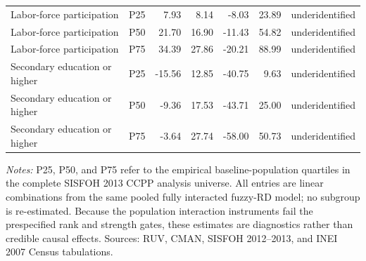 \begin{table}[!htbp]
{\begin{tabular}{llrrrrl}
Labor-force participation & P25 & 7.93 & 8.14 & -8.03 & 23.89 & underidentified \\
Labor-force participation & P50 & 21.70 & 16.90 & -11.43 & 54.82 & underidentified \\
Labor-force participation & P75 & 34.39 & 27.86 & -20.21 & 88.99 & underidentified \\
Secondary education or higher & P25 & -15.56 & 12.85 & -40.75 & 9.63 & underidentified \\
Secondary education or higher & P50 & -9.36 & 17.53 & -43.71 & 25.00 & underidentified \\
Secondary education or higher & P75 & -3.64 & 27.74 & -58.00 & 50.73 & underidentified \\
\bottomrule
\end{tabular}}
\parbox{0.97\linewidth}{\footnotesize \textit{Notes:} P25, P50, and P75 refer to the empirical baseline-population quartiles in the complete SISFOH 2013 CCPP analysis universe. All entries are linear combinations from the same pooled fully interacted fuzzy-RD model; no subgroup is re-estimated. Because the population interaction instruments fail the prespecified rank and strength gates, these estimates are diagnostics rather than credible causal effects. Sources: RUV, CMAN, SISFOH 2012--2013, and INEI 2007 Census tabulations.}
\end{table}
